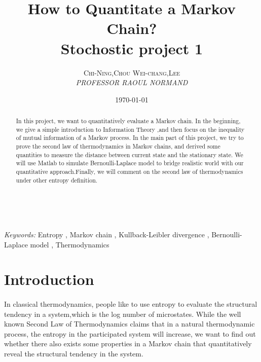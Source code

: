 \documentclass[a4paper, 11pt]{article} %
\title{\textbf{How to Quantitate a Markov Chain?}\\ %
Stochostic project 1} %
\author{\textsc{Chi-Ning,Chou  Wei-chang,Lee} %
\\{\textit{PROFESSOR RAOUL NORMAND }}} %
\date{\today} %
\makeatletter
\renewcommand{\maketitle}{ %
\begin{flushright} %
{\LARGE\@title} %

\vspace{50pt} %

{\large\@author} %
\\\@date %

\vspace{40pt} %
\end{flushright}
}
\makeatother
\begin{document}
\maketitle %



\begin{abstract}
In this project, we want to quantitatively evaluate a Markov chain. In the beginning, we give a simple introduction to Information Theory ,and then focus on the inequality of mutual information of a Markov process. In the main part of this project, we try to prove the second law of thermodynamics in Markov chains, and derived some quantities to measure the distance between current state and the stationary state. We will use Matlab to simulate Bernoulli-Laplace model to bridge realistic world with our quantitative approach.Finally, we will comment on the second law of thermodynamics under other entropy definition.
\end{abstract}

\hspace*{5,6mm}\textit{Keywords:} Entropy , Markov chain , Kullback-Leibler divergence , Bernoulli-Laplace model , Thermodynamics %

\vspace{30pt} %


\section*{Introduction}

\paragraph{}
In classical thermodynamics, people like to use entropy to evaluate the structural tendency in a system,which is the log number of microstates.
While the well known Second Law of Thermodynamics claims that in a natural thermodynamic process, the
entropy in the participated system will increase, we want to find out whether there also exists some properties
in a Markov chain that quantitatively reveal the structural tendency in the system.
\end{document}
